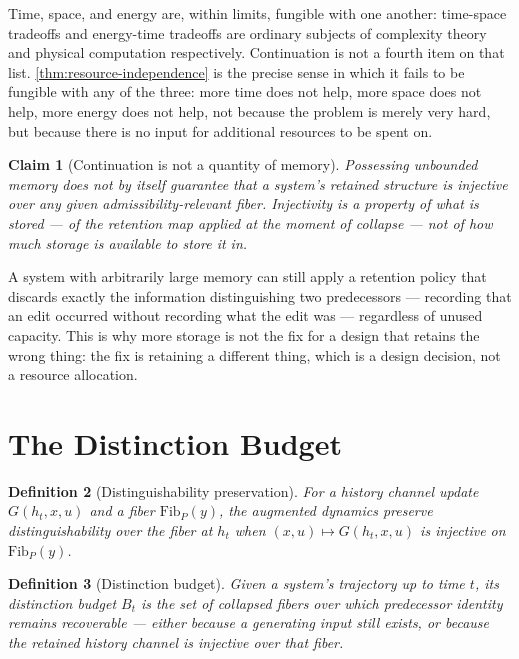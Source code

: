 \documentclass[12pt]{report}
\newtheorem{definition}{Definition}[section]
\newtheorem{claim}[definition]{Claim}
\begin{document}
Time, space, and energy are, within limits, fungible with one another:
time-space tradeoffs and energy-time tradeoffs are ordinary subjects of
complexity theory and physical computation respectively. Continuation is
not a fourth item on that list. \cref{thm:resource-independence} is the
precise sense in which it fails to be fungible with any of the three:
more time does not help, more space does not help, more energy does not
help, not because the problem is merely very hard, but because there is
no input for additional resources to be spent on.

\begin{claim}[Continuation is not a quantity of memory]
\label{prop:not-memory}
Possessing unbounded memory does not by itself guarantee that a system's
retained structure is injective over any given admissibility-relevant
fiber. Injectivity is a property of \emph{what} is stored --- of the
retention map applied at the moment of collapse --- not of \emph{how
much} storage is available to store it in.
\end{claim}

A system with arbitrarily large memory can still apply a retention
policy that discards exactly the information distinguishing two
predecessors --- recording that an edit occurred without recording what
the edit was --- regardless of unused capacity. This is why more storage
is not the fix for a design that retains the wrong thing: the fix is
retaining a different thing, which is a design decision, not a resource
allocation.

\section{The Distinction Budget}
\label{sec:distinction-budget}

\begin{definition}[Distinguishability preservation]
\label{def:distinguishability}
For a history channel update $G(h_t, x, u)$ and a fiber
$\mathrm{Fib}_P(y)$, the augmented dynamics preserve distinguishability
over the fiber at $h_t$ when $(x,u) \mapsto G(h_t,x,u)$ is injective on
$\mathrm{Fib}_P(y)$.
\end{definition}

\begin{definition}[Distinction budget]
\label{def:distinction-budget}
Given a system's trajectory up to time $t$, its distinction budget $B_t$
is the set of collapsed fibers over which predecessor identity remains
recoverable --- either because a generating input still exists, or
because the retained history channel is injective over that fiber.
\end{definition}
\end{document}
